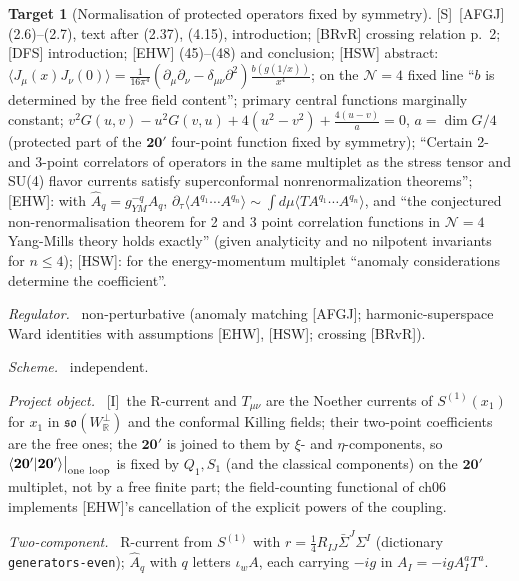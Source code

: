 \documentclass[11pt]{article}
\theoremstyle{definition}
\newtheorem{target}{Target}
\newcommand{\Sl}{\textup{[S]}}
\newcommand{\Il}{\textup{[I]}}
\newcommand{\oneloop}{\big|_{\rm one\ loop}}
\newcommand{\fld}[1]{\par\textit{#1.}\ }
\begin{document}
\begin{target}[Normalisation of protected operators fixed by symmetry]\label{t:norm}
\Sl\ [AFGJ] (2.6)--(2.7), text after (2.37), (4.15), introduction; [BRvR] crossing relation p.~2; [DFS] introduction; [EHW] (45)--(48) and conclusion; [HSW] abstract: $\langle J_\mu(x)J_\nu(0)\rangle=\frac1{16\pi^4}(\partial_\mu\partial_\nu-\delta_{\mu\nu}\partial^2)\frac{b(g(1/x))}{x^4}$; on the $\mathcal N=4$ fixed line ``$b$ is determined by the free field content''; primary central functions marginally constant; $v^2G(u,v)-u^2G(v,u)+4(u^2-v^2)+\frac{4(u-v)}a=0$, $a=\dim G/4$ (protected part of the $\mathbf{20'}$ four-point function fixed by symmetry); ``Certain 2- and 3-point correlators of operators in the same multiplet as the stress tensor and SU(4) flavor currents satisfy superconformal nonrenormalization theorems''; [EHW]: with $\hat A_q=g_{YM}^{-q}A_q$, $\partial_\tau\langle A^{q_1}\cdots A^{q_n}\rangle\sim\int d\mu\langle T A^{q_1}\cdots A^{q_n}\rangle$, and ``the conjectured non-renormalisation theorem for 2 and 3 point correlation functions in $\mathcal N=4$ Yang-Mills theory holds exactly'' (given analyticity and no nilpotent invariants for $n\le4$); [HSW]: for the energy-momentum multiplet ``anomaly considerations determine the coefficient''.
\fld{Regulator} non-perturbative (anomaly matching [AFGJ]; harmonic-superspace Ward identities with assumptions [EHW], [HSW]; crossing [BRvR]).
\fld{Scheme} independent.
\fld{Project object} \Il\ the R-current and $T_{\mu\nu}$ are the Noether currents of $S^{(1)}(x_1)$ for $x_1$ in $\mathfrak{so}(W_{\mathbb R}^\perp)$ and the conformal Killing fields; their two-point coefficients are the free ones; the $\mathbf{20'}$ is joined to them by $\xi$- and $\eta$-components, so $\langle\mathbf{20'}|\mathbf{20'}\rangle\oneloop$ is fixed by $Q_1,S_1$ (and the classical components) on the $\mathbf{20'}$ multiplet, not by a free finite part; the field-counting functional of ch06 implements [EHW]'s cancellation of the explicit powers of the coupling.
\fld{Two-component} R-current from $S^{(1)}$ with $r=\tfrac14R_{IJ}\bar\Sigma^J\Sigma^I$ (dictionary \texttt{generators-even}); $\hat A_q$ with $q$ letters $\iota_wA$, each carrying $-ig$ in $A_I=-igA^a_IT^a$.
\end{target}
\end{document}
